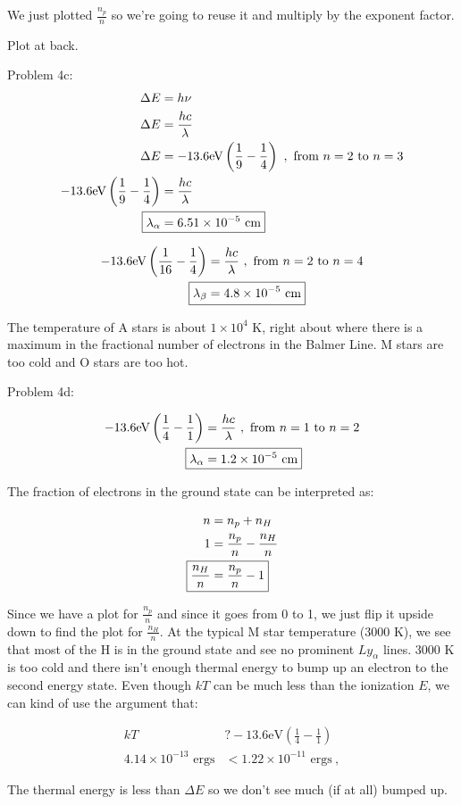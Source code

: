 \documentclass[10pt,letter,preprint]{aastex}
\newcommand{\rp}{\right)}
\newcommand{\lp}{\left(}
\begin{document}
We just plotted $\frac{n_p}{n}$ so we're going to reuse it and multiply by the exponent factor.

Plot at back.

\newpage
Problem 4c:
\begin{align}
\Delta E &= h \nu\\
\Delta E &= \frac{h c}{\lambda}\\
\Delta E &= -13.6\textrm{eV} \lp \frac{1}{9} - \frac{1}{4} \rp~,\textrm{ from $n=2$ to $n=3$}\\
-13.6\textrm{eV} \lp \frac{1}{9} - \frac{1}{4} \rp &= \frac{h c}{\lambda}\\
\Aboxed{\lambda_\alpha &= 6.51 \times 10^{-5} \textrm{ cm}}
\end{align}

\begin{align}
-13.6\textrm{eV} \lp \frac{1}{16} - \frac{1}{4} \rp &= \frac{h c}{\lambda}~,\textrm{ from $n=2$ to $n=4$}\\
\Aboxed{\lambda_\beta &= 4.8 \times 10^{-5} \textrm{ cm}}
\end{align}

The temperature of A stars is about $1 \times 10^4$ K, right about where there is a maximum in the fractional number of electrons in the Balmer Line. M stars are too cold and O stars are too hot. 

Problem 4d:

\begin{align}
-13.6\textrm{eV} \lp \frac{1}{4} - \frac{1}{1} \rp &= \frac{h c}{\lambda}~,\textrm{ from $n=1$ to $n=2$}\\
\Aboxed{\lambda_\alpha &= 1.2 \times 10^{-5} \textrm{ cm}}
\end{align}

The fraction of electrons in the ground state can be interpreted as:

\begin{align}
n &= n_p + n_H\\
1&= \frac{n_p}{n} - \frac{n_H}{n}\\
\Aboxed{\frac{n_H}{n} &=  \frac{n_p}{n}  - 1}
\end{align}

Since we have a plot for $ \frac{n_p}{n}$ and since it goes from 0 to 1, we just flip it upside down to find the plot for $\frac{n_H}{n}$. At the typical M star temperature (3000 K), we see that most of the H is in the ground state and see no prominent $Ly_\alpha$ lines. 3000 K is too cold and there isn't enough thermal energy to bump up an electron to the second energy state. Even though $kT$ can be much less than the ionization $E$, we can kind of use the argument that:

\begin{align}
kT ~&? -13.6\textrm{eV} \lp \frac{1}{4} - \frac{1}{1} \rp\\
4.14 \times 10^{-13}\textrm{ ergs} &< 1.22 \times 10^{-11}\textrm{ ergs}~,
\end{align}

The thermal energy is less than $\Delta E$ so we don't see much (if at all) bumped up.
\end{document}
